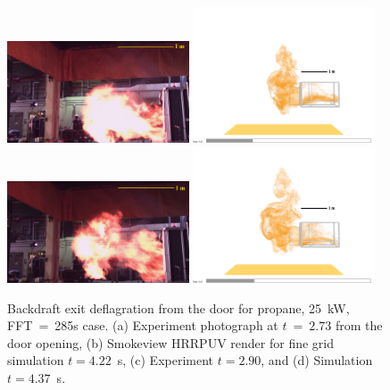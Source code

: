 \documentclass[12pt,letterpaper]{article}
\begin{document}
\begin{flushleft}
%
\begin{figure}[tb]
    \centering
    \includegraphics[trim = 0mm 0mm 0mm 0mm, clip,width=0.48\textwidth]{246 vlcsnap-2023-01-30-22h18m26s991.png}
    \includegraphics[trim = 50mm 50mm 60mm 80mm, clip,width=0.48\textwidth]{NIST_Backdraft_Propane_25kW_285s_low_EXT2_HRRPUV_4p22s.png}
     \\
    \includegraphics[trim = 0mm 0mm 0mm 0mm, clip,width=0.48\textwidth]{246 vlcsnap-2023-01-30-22h18m40s863.png}
    \includegraphics[trim = 50mm 50mm 60mm 80mm, clip,width=0.48\textwidth]{NIST_Backdraft_Propane_25kW_285s_low_EXT2_HRRPUV_4p37s.png}
    \caption{Backdraft exit deflagration from the door for propane, 25~kW, FFT~=~285s case. (a) Experiment photograph at $t~=~2.73$ from the door opening, (b) Smokeview HRRPUV render for fine grid simulation $t=4.22$~s, (c) Experiment $t=2.90$, and (d) Simulation $t=4.37$~s.}
    \label{fig:prop_fire}
\end{figure}
%


\end{flushleft}
\end{document}
